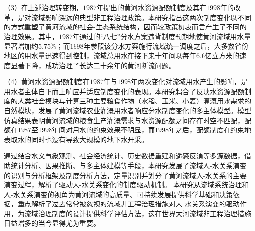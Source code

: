 \begin{cabstract}
（3）在上述治理转变期，$1987$年提出的黄河水资源配额制度及其在$1998$年的改革，是对流域影响深远的典型非工程治理政策。本研究指出这两次制度变化以不同的方式重塑了黄河流域的社会-生态系统结构，因而较政策初衷而言产生了不同的治理效果。其中，$1987$年通过的“八七”分水方案违背制度预期地使黄河流域用水量显著增加约$5.75\%$；而$1998$年参照该分水方案施行流域统一调度之后，大多数省份地区的用水量迅速得到控制，流域总用水在接下来十年间以每年$6.6$亿立方米的速度显著下降，成功治理了长达二十余年的黄河断流问题。

（4）黄河水资源配额制度在$1987$年与$1998$年两次变化对流域用水产生的影响，是用水者主体自下而上响应并适应制度变化的表现。本研究耦合了反映水资源配额制度的人类社会模块与计算三种主要粮食作物（水稻、玉米、小麦）灌溉用水需求的自然模块，发展了黄河流域农业灌溉用水者响应分水制度变化的多主体模型。模型仿真结果表明黄河流域的粮食生产灌溉需求与水资源配额之间存在时空不匹配，配额在$1987$至$1998$年间对用水的约束效果不明显，而$1998$年之后，配额制度在约束地表取水的同时也没有导致大规模的地下水开采。

通过结合水文气象观测、社会经济统计、历史数据重建和遥感反演等多源数据，借助统计分析、因果推断、与多主体建模等手段，本研究发展了流域人-水关系演变的识别与分析框架及制度分析方法，定量识别并划分了黄河流域人-水关系的主要演变过程，解析了驱动人-水关系变化的制度驱动机制。
本研究从流域系统治理和人-水关系演变的视角为黄河流域的高质量、可持续发展提供科学基础和决策依据，重点解析了过去常常被忽视的流域非工程治理措施对人-水关系演变的驱动作用，为流域治理制度的设计提供科学评估方法，这在世界大河流域非工程治理措施日益增多的当今显得尤为重要。


\end{cabstract}



